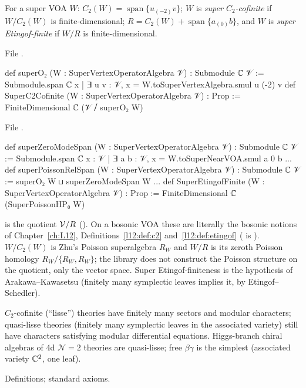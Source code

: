 \begin{definition}\label{l17:def:c2}
For a super VOA $W$: $C_2(W)=\operatorname{span}\{u_{(-2)}v\}$; $W$ is \emph{super $C_2$-cofinite}
if $W/C_2(W)$ is finite-dimensional; $R=C_2(W)+\operatorname{span}\{a_{(0)}b\}$, and $W$ is
\emph{super Etingof-finite} if $W/R$ is finite-dimensional.
\end{definition}
\noindent File .
\begin{leancode}
def superO₂ (W : SuperVertexOperatorAlgebra 𝒱) : Submodule ℂ 𝒱 :=
  Submodule.span ℂ {x | ∃ u v : 𝒱, x = W.toSuperVertexAlgebra.smul u (-2) v}
def SuperC2Cofinite (W : SuperVertexOperatorAlgebra 𝒱) : Prop :=
  FiniteDimensional ℂ (𝒱 ⧸ superO₂ W)
\end{leancode}
\noindent File .
\begin{leancode}
def superZeroModeSpan (W : SuperVertexOperatorAlgebra 𝒱) : Submodule ℂ 𝒱 :=
  Submodule.span ℂ {x : 𝒱 | ∃ a b : 𝒱, x = W.toSuperNearVOA.smul a 0 b}
...
def superPoissonRelSpan (W : SuperVertexOperatorAlgebra 𝒱) : Submodule ℂ 𝒱 :=
  superO₂ W ⊔ superZeroModeSpan W
...
def SuperEtingofFinite (W : SuperVertexOperatorAlgebra 𝒱) : Prop :=
  FiniteDimensional ℂ (SuperPoissonHP₀ W)
\end{leancode}
\begin{dictionary}
 is the quotient $\mathcal{V}/R$ (). On a bosonic
VOA these are literally the bosonic notions of Chapter~\ref{ch:L12}, Definitions~\ref{l12:def:c2}
and~\ref{l12:def:etingof} ( is ). $W/C_2(W)$ is
Zhu's Poisson superalgebra $R_W$ and $W/R$ is its zeroth Poisson homology $R_W/\{R_W,R_W\}$; the
library does not construct the Poisson structure on the quotient, only the vector space. Super
Etingof-finiteness is the hypothesis of Arakawa--Kawasetsu (finitely many symplectic leaves implies it,
by Etingof--Schedler).
\end{dictionary}
\begin{physics}
$C_2$-cofinite (``lisse'') theories have finitely many sectors and modular characters; quasi-lisse
theories (finitely many symplectic leaves in the associated variety) still have characters satisfying
modular differential equations. Higgs-branch chiral algebras of 4d $\mathcal N=2$ theories are
quasi-lisse; free $\beta\gamma$ is the simplest (associated variety ${\mathbb{C}}^2$, one leaf).
\end{physics}
\begin{status}
Definitions; standard axioms.
\end{status}

